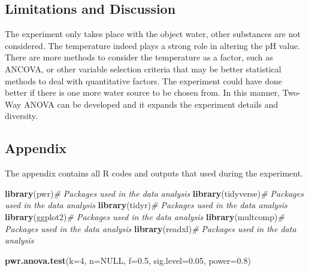 \documentclass[12pt,]{article}
\newenvironment{Shaded}{\begin{snugshade}}{\end{snugshade}}
\newcommand{\CommentTok}[1]{\textcolor[rgb]{0.56,0.35,0.01}{\textit{#1}}}
\newcommand{\DataTypeTok}[1]{\textcolor[rgb]{0.13,0.29,0.53}{#1}}
\newcommand{\DecValTok}[1]{\textcolor[rgb]{0.00,0.00,0.81}{#1}}
\newcommand{\FloatTok}[1]{\textcolor[rgb]{0.00,0.00,0.81}{#1}}
\newcommand{\KeywordTok}[1]{\textcolor[rgb]{0.13,0.29,0.53}{\textbf{#1}}}
\newcommand{\NormalTok}[1]{#1}
\newcommand{\OtherTok}[1]{\textcolor[rgb]{0.56,0.35,0.01}{#1}}
\begin{document}
\hypertarget{limitations-and-discussion}{%
\subsection{Limitations and
Discussion}\label{limitations-and-discussion}}

The experiment only takes place with the object water, other substances
are not considered. The temperature indeed plays a strong role in
altering the pH value. There are more methods to consider the
temperature as a factor, such as ANCOVA, or other variable selection
criteria that may be better statistical methods to deal with
quantitative factors. The experiment could have done better if there is
one more water source to be chosen from. In this manner, Two-Way ANOVA
can be developed and it expands the experiment details and diversity.
\newpage

\hypertarget{appendix}{%
\subsection{Appendix}\label{appendix}}

The appendix contains all R codes and outputs that used during the
experiment.

\begin{Shaded}
\begin{Highlighting}[]
\KeywordTok{library}\NormalTok{(pwr)}\CommentTok{# Packages used in the data analysis}
\KeywordTok{library}\NormalTok{(tidyverse)}\CommentTok{# Packages used in the data analysis}
\KeywordTok{library}\NormalTok{(tidyr)}\CommentTok{# Packages used in the data analysis}
\KeywordTok{library}\NormalTok{(ggplot2)}\CommentTok{# Packages used in the data analysis}
\KeywordTok{library}\NormalTok{(multcomp)}\CommentTok{# Packages used in the data analysis}
\KeywordTok{library}\NormalTok{(readxl)}\CommentTok{# Packages used in the data analysis}
\end{Highlighting}
\end{Shaded}

\begin{Shaded}
\begin{Highlighting}[]
\KeywordTok{pwr.anova.test}\NormalTok{(}\DataTypeTok{k=}\DecValTok{4}\NormalTok{, }\DataTypeTok{n=}\OtherTok{NULL}\NormalTok{, }\DataTypeTok{f=}\FloatTok{0.5}\NormalTok{, }\DataTypeTok{sig.level=}\FloatTok{0.05}\NormalTok{, }\DataTypeTok{power=}\FloatTok{0.8}\NormalTok{) }
\end{Highlighting}
\end{Shaded}
\end{document}
